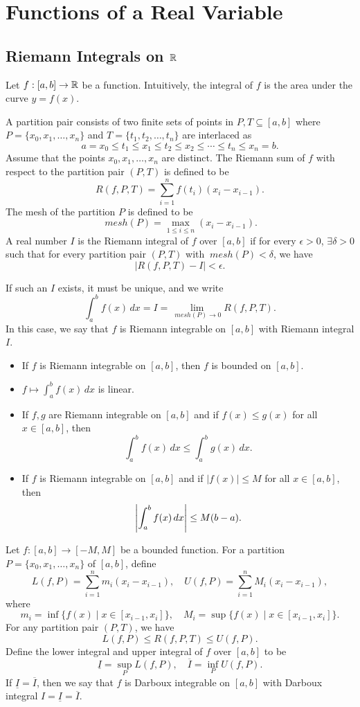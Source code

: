 \chapter{Functions of a Real Variable}

\section{Riemann Integrals on ${\mathbb R}$}

Let $f: [a, b] \to {\mathbb R}$ be a function. Intuitively, the integral of $f$ is the area under the curve $y = f(x)$. 

A partition pair consists of two finite sets of points in $P, T \subseteq [a, b]$ where $P = \{x_0, x_1, \ldots, x_n\}$ and $T = \{t_1, t_2, \ldots, t_n\}$ are interlaced as
\[
a = x_0 \leq t_1 \leq x_1 \leq t_2 \leq x_2 \leq \cdots \leq t_n \leq x_n = b.
\]
Assume that the points $x_0, x_1, \ldots, x_n$ are distinct. The Riemann sum of $f$ with respect to the partition pair $(P, T)$ is defined to be
\[
R(f, P, T) = \sum_{i=1}^n f(t_i)(x_i - x_{i-1}).
\]
The mesh of the partition $P$ is defined to be
\[
~mesh (P) = \max_{1 \leq i \leq n} (x_i - x_{i-1}).
\]
A real number $I$ is the Riemann integral of $f$ over $[a, b]$ if for every $\epsilon > 0$, $\exists \delta > 0$ such that for every partition pair $(P, T)$ with $~mesh(P) < \delta$, we have
\[
|R(f, P, T) - I| < \epsilon.
\]

If such an $I$ exists, it must be unique, and we write
\[
\int_a^b f(x) \, dx = I = \lim_{~mesh(P) \to 0} R(f, P, T).
\]
In this case, we say that $f$ is Riemann integrable on $[a, b]$ with Riemann integral $I$.

\begin{itemize}
    \item If $f$ is Riemann integrable on $[a, b]$, then $f$ is bounded on $[a, b]$.
    \item $f \mapsto \int_a^b f(x) \, dx$ is linear.
    \item If $f, g$ are Riemann integrable on $[a, b]$ and if $f(x) \leq g(x)$ for all $x \in [a, b]$, then
    \[
    \int_a^b f(x) \, dx \leq \int_a^b g(x) \, dx.
    \]
    \item If $f$ is Riemann integrable on $[a, b]$ and if $|f(x)| \leq M$ for all $x \in [a, b]$, then
    \[
    {\left| \int_a^b f(x) \, dx \right|} \leq M(b - a).
    \]
\end{itemize}

Let $f: [a, b] \to [-M, M]$ be a bounded function. For a partition $P = \{x_0, x_1, \ldots, x_n\}$ of $[a, b]$, define
\[
L(f, P) = \sum_{i=1}^n m_i (x_i - x_{i-1}), \quad U(f, P) = \sum_{i=1}^n M_i (x_i - x_{i-1}),
\]
where
\[
m_i = \inf \{f(x) \mid x \in [x_{i-1}, x_i]\}, \quad M_i = \sup \{f(x) \mid x \in [x_{i-1}, x_i]\}.
\]
For any partition pair $(P, T)$, we have
\[
L(f, P) \leq R(f, P, T) \leq U(f, P).
\]
Define the lower integral and upper integral of $f$ over $[a, b]$ to be
\[
\underline{I} = \sup_P L(f, P), \quad \overline{I} = \inf_P U(f, P).
\]
If $\underline{I} = \overline{I}$, then we say that $f$ is Darboux integrable on $[a, b]$ with Darboux integral $I = \underline{I} = \overline{I}$.

